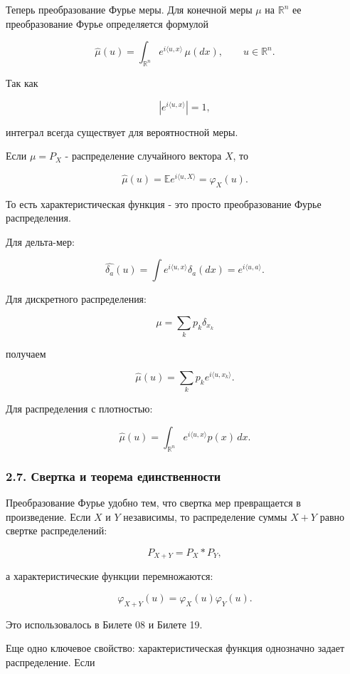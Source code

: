 \documentclass[
  11pt,
  a4paper,
]{article}
\begin{document}
Теперь преобразование Фурье меры. Для конечной меры \(\mu\) на
\(\mathbb R^n\) ее преобразование Фурье определяется формулой

\[
\widehat\mu(u)
=
\int_{\mathbb R^n}e^{i\langle u,x\rangle}\,\mu(dx),
\qquad
u\in\mathbb R^n.
\]

Так как

\[
|e^{i\langle u,x\rangle}|=1,
\]

интеграл всегда существует для вероятностной меры.

Если \(\mu=P_X\) - распределение случайного вектора \(X\), то

\[
\widehat\mu(u)
=
\mathbb E e^{i\langle u,X\rangle}
=
\varphi_X(u).
\]

То есть характеристическая функция - это просто преобразование Фурье
распределения.

Для дельта-мер:

\[
\widehat{\delta_a}(u)
=
\int e^{i\langle u,x\rangle}\delta_a(dx)
=
e^{i\langle u,a\rangle}.
\]

Для дискретного распределения:

\[
\mu=\sum_k p_k\delta_{x_k}
\]

получаем

\[
\widehat\mu(u)=\sum_k p_k e^{i\langle u,x_k\rangle}.
\]

Для распределения с плотностью:

\[
\widehat\mu(u)=\int_{\mathbb R^n}e^{i\langle u,x\rangle}p(x)\,dx.
\]

\subsubsection{2.7. Свертка и теорема
единственности}\label{ux441ux432ux435ux440ux442ux43aux430-ux438-ux442ux435ux43eux440ux435ux43cux430-ux435ux434ux438ux43dux441ux442ux432ux435ux43dux43dux43eux441ux442ux438}

Преобразование Фурье удобно тем, что свертка мер превращается в
произведение. Если \(X\) и \(Y\) независимы, то распределение суммы
\(X+Y\) равно свертке распределений:

\[
P_{X+Y}=P_X*P_Y,
\]

а характеристические функции перемножаются:

\[
\varphi_{X+Y}(u)=\varphi_X(u)\varphi_Y(u).
\]

Это использовалось в Билете 08 и Билете 19.

Еще одно ключевое свойство: характеристическая функция однозначно задает
распределение. Если
\end{document}
